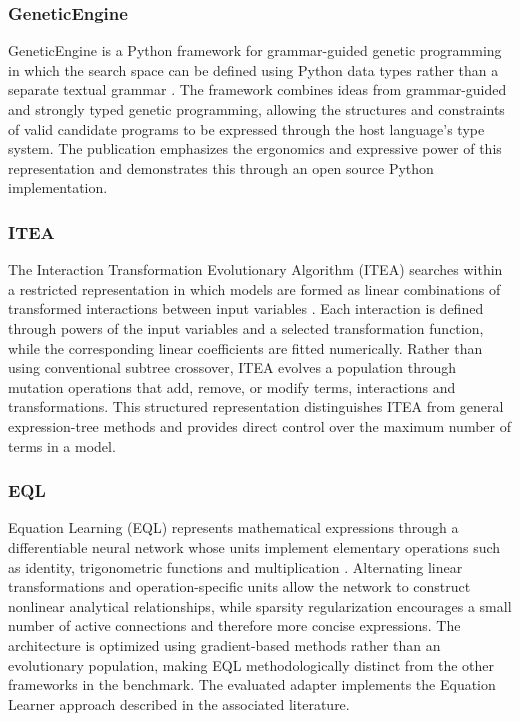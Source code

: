 \documentclass[12pt,oneside,bibtotoc,liststotoc]{scrbook}
\begin{document}
\subsubsection{GeneticEngine}

GeneticEngine is a Python framework for grammar-guided genetic programming in which the search space can be defined using Python data types rather than a separate textual grammar \cite{espada2022datatypes}. The framework combines ideas from grammar-guided and strongly typed genetic programming, allowing the structures and constraints of valid candidate programs to be expressed through the host language's type system. The publication emphasizes the ergonomics and expressive power of this representation and demonstrates this through an open source Python implementation.

\subsubsection{ITEA}

The Interaction Transformation Evolutionary Algorithm (ITEA) searches within a restricted representation in which models are formed as linear combinations of transformed interactions between input variables \cite{defranca2021itea}. Each interaction is defined through powers of the input variables and a selected transformation function, while the corresponding linear coefficients are fitted numerically. Rather than using conventional subtree crossover, ITEA evolves a population through mutation operations that add, remove, or modify terms, interactions and transformations. This structured representation distinguishes ITEA from general expression-tree methods and provides direct control over the maximum number of terms in a model.

\subsubsection{EQL}

Equation Learning (EQL) represents mathematical expressions through a differentiable neural network whose units implement elementary operations such as identity, trigonometric functions and multiplication \cite{sahoo2018eql}. Alternating linear transformations and operation-specific units allow the network to construct nonlinear analytical relationships, while sparsity regularization encourages a small number of active connections and therefore more concise expressions. The architecture is optimized using gradient-based methods rather than an evolutionary population, making EQL methodologically distinct from the other frameworks in the benchmark. The evaluated adapter implements the Equation Learner approach described in the associated literature.
\end{document}
